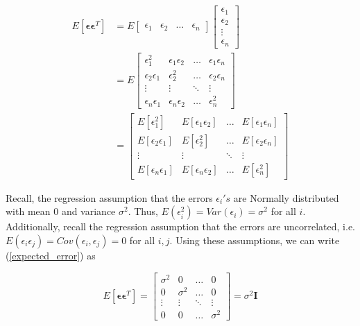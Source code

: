 \documentclass[]{book}
\begin{document}
\begin{equation}
\label{expected_error}
\begin{aligned}
E[\boldsymbol{\epsilon}\boldsymbol{\epsilon}^T] &= E \begin{bmatrix}\epsilon_1  & \epsilon_2 & \dots & \epsilon_n \end{bmatrix}\begin{bmatrix}\epsilon_1 \\ \epsilon_2 \\ \vdots \\ \epsilon_n \end{bmatrix}  \\[10pt]
& = E \begin{bmatrix} \epsilon_1^2  & \epsilon_1 \epsilon_2 & \dots & \epsilon_1 \epsilon_n \\
\epsilon_2 \epsilon_1 & \epsilon_2^2 & \dots & \epsilon_2 \epsilon_n \\ 
\vdots & \vdots & \ddots & \vdots \\ 
\epsilon_n \epsilon_1 & \epsilon_n \epsilon_2 & \dots & \epsilon_n^2 
\end{bmatrix} \\[10pt]
& = \begin{bmatrix} E[\epsilon_1^2]  & E[\epsilon_1 \epsilon_2] & \dots & E[\epsilon_1 \epsilon_n] \\
E[\epsilon_2 \epsilon_1] & E[\epsilon_2^2] & \dots & E[\epsilon_2 \epsilon_n] \\
\vdots & \vdots & \ddots & \vdots \\ 
E[\epsilon_n \epsilon_1] & E[\epsilon_n \epsilon_2] & \dots & E[\epsilon_n^2]
\end{bmatrix}
\end{aligned}
\end{equation}

Recall, the regression assumption that the errors \(\epsilon_i's\) are
Normally distributed with mean 0 and variance \(\sigma^2\). Thus,
\(E(\epsilon_i^2) = Var(\epsilon_i) = \sigma^2\) for all \(i\).
Additionally, recall the regression assumption that the errors are
uncorrelated, i.e.
\(E(\epsilon_i \epsilon_j) = Cov(\epsilon_i, \epsilon_j) = 0\) for all
\(i,j\). Using these assumptions, we can write (\ref{expected_error}) as

\begin{equation}
E[\mathbf{\epsilon}\mathbf{\epsilon}^T]  = \begin{bmatrix} \sigma^2  & 0 & \dots & 0 \\
0 & \sigma^2  & \dots & 0 \\
\vdots & \vdots & \ddots & \vdots \\
0 & 0 & \dots & \sigma^2
\end{bmatrix} = \sigma^2 \mathbf{I}
\end{equation}
\end{document}
